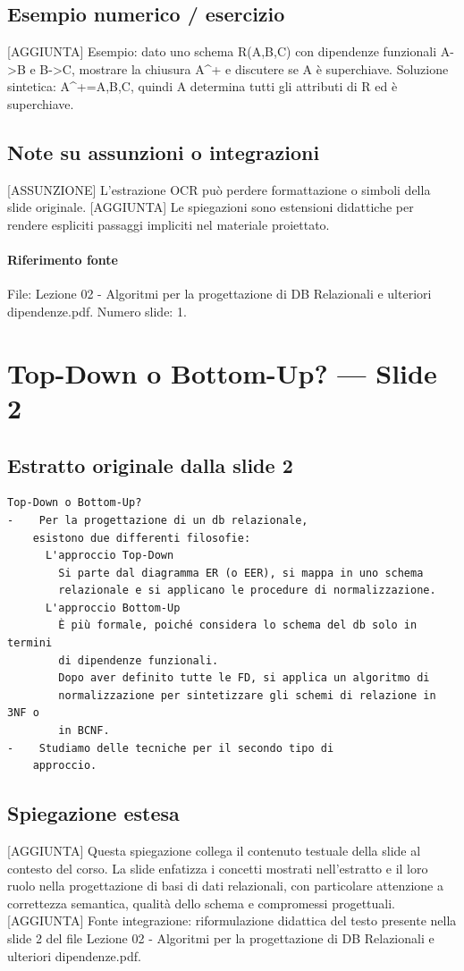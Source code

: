 \documentclass[11pt]{article}
\begin{document}
\subsection*{Esempio numerico / esercizio}
[AGGIUNTA] Esempio: dato uno schema R(A,B,C) con dipendenze funzionali A->B e B->C, mostrare la chiusura A^+ e discutere se A è superchiave. Soluzione sintetica: A^+={A,B,C}, quindi A determina tutti gli attributi di R ed è superchiave.
\subsection*{Note su assunzioni o integrazioni}
[ASSUNZIONE] L'estrazione OCR può perdere formattazione o simboli della slide originale.
[AGGIUNTA] Le spiegazioni sono estensioni didattiche per rendere espliciti passaggi impliciti nel materiale proiettato.
\paragraph{Riferimento fonte} File: Lezione 02 - Algoritmi per la progettazione di DB Relazionali e ulteriori dipendenze.pdf. Numero slide: 1.
\section{Top-Down o Bottom-Up? --- Slide 2}
\subsection*{Estratto originale dalla slide 2}
\begin{lstlisting}
Top-Down o Bottom-Up?
-    Per la progettazione di un db relazionale,
    esistono due differenti filosofie:
      L'approccio Top-Down
        Si parte dal diagramma ER (o EER), si mappa in uno schema
        relazionale e si applicano le procedure di normalizzazione.
      L'approccio Bottom-Up
        È più formale, poiché considera lo schema del db solo in termini
        di dipendenze funzionali.
        Dopo aver definito tutte le FD, si applica un algoritmo di
        normalizzazione per sintetizzare gli schemi di relazione in 3NF o
        in BCNF.
-    Studiamo delle tecniche per il secondo tipo di
    approccio.
\end{lstlisting}
\subsection*{Spiegazione estesa}
[AGGIUNTA] Questa spiegazione collega il contenuto testuale della slide al contesto del corso. La slide enfatizza i concetti mostrati nell'estratto e il loro ruolo nella progettazione di basi di dati relazionali, con particolare attenzione a correttezza semantica, qualità dello schema e compromessi progettuali.
[AGGIUNTA] Fonte integrazione: riformulazione didattica del testo presente nella slide 2 del file Lezione 02 - Algoritmi per la progettazione di DB Relazionali e ulteriori dipendenze.pdf.
\end{document}
